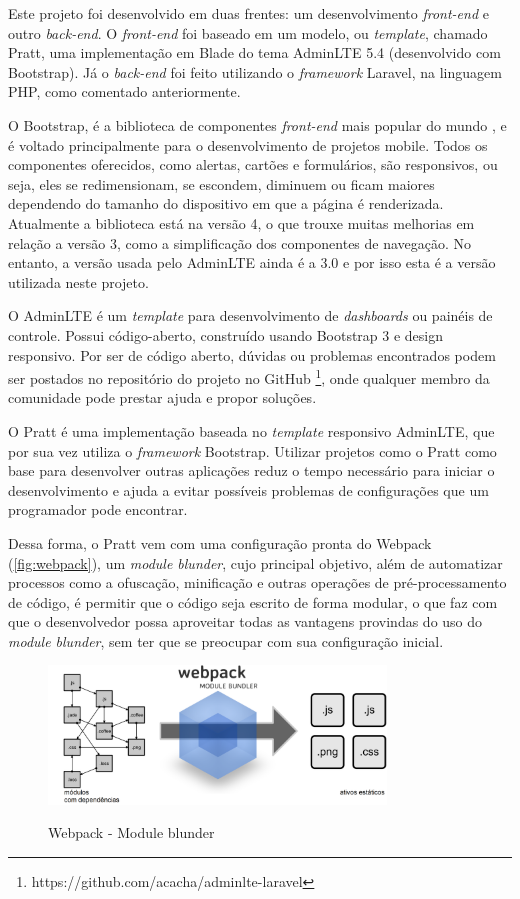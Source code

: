 \newpage
Este projeto foi desenvolvido em duas frentes: um desenvolvimento \textit{front-end} e outro \textit{back-end}. O \textit{front-end} foi baseado em um modelo, ou \textit{template}, chamado Pratt, uma implementação em Blade do tema AdminLTE 5.4 (desenvolvido com Bootstrap). Já o \textit{back-end} foi feito utilizando o \textit{framework} Laravel, na linguagem PHP, como comentado anteriormente.

O Bootstrap, é a biblioteca de componentes \textit{front-end} mais popular do mundo \cite{bootstrap}, e é voltado principalmente para o desenvolvimento de projetos mobile. Todos os componentes oferecidos, como alertas, cartões e formulários, são responsivos, ou seja, eles se redimensionam, se escondem, diminuem ou ficam maiores dependendo do tamanho do dispositivo em que a página é renderizada. Atualmente a biblioteca está na versão 4, o que trouxe muitas melhorias em relação a versão 3, como a simplificação dos componentes de navegação. No entanto, a versão usada pelo AdminLTE ainda é a 3.0 e por isso esta é a versão utilizada neste projeto.

O AdminLTE é um \textit{template} para desenvolvimento de \textit{dashboards} ou painéis de controle. Possui código-aberto, construído usando Bootstrap 3 e design responsivo. Por ser de código aberto, dúvidas ou problemas encontrados podem ser postados no repositório do projeto no GitHub
\footnote{https://github.com/acacha/adminlte-laravel}, onde qualquer membro da comunidade pode prestar ajuda e propor soluções.

O Pratt é uma implementação baseada no \textit{template} responsivo AdminLTE, que por sua vez utiliza o \textit{framework} Bootstrap. Utilizar projetos como o Pratt como base para desenvolver outras aplicações reduz o tempo necessário para iniciar o desenvolvimento e ajuda a evitar possíveis problemas de configurações que um programador pode encontrar. 

Dessa forma, o Pratt vem com uma configuração pronta do Webpack (\autoref{fig:webpack}), um \textit{module blunder}, cujo principal objetivo, além de automatizar processos como a ofuscação, minificação e outras operações de pré-processamento de código, é permitir que o código seja escrito de forma modular, o que faz com que o desenvolvedor possa aproveitar todas as vantagens provindas do uso do \textit{module blunder}, sem ter que se preocupar com sua configuração inicial.

\begin{figure}[H]
    \centering
    \caption{Webpack - Module blunder}
    \includegraphics[width=0.8\textwidth]{./dados/figuras/fig17}
    \label{fig:webpack}
\end{figure}

